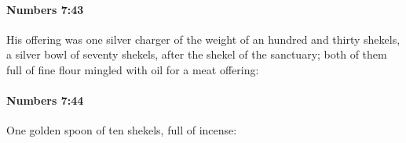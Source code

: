 		\paragraph{Numbers 7:43} %
			\label{NUMBERS-7-43}

			His offering was one silver charger of the weight of an hundred and thirty shekels, a silver bowl of seventy shekels, after the shekel of the sanctuary; both of them full of fine flour mingled with oil for a meat offering:


		\paragraph{Numbers 7:44} %
			\label{NUMBERS-7-44}

			One golden spoon of ten shekels, full of incense:


